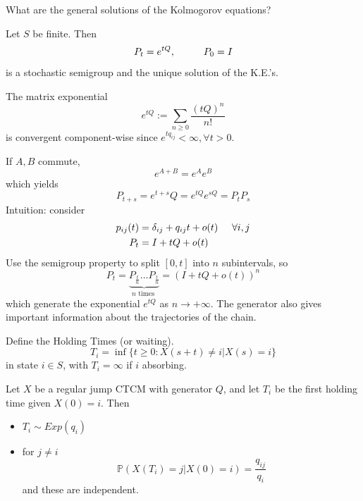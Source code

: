 \documentclass{article}
\begin{document}
What are the general solutions of the Kolmogorov equations?
\begin{theorem}
	Let $S$ be finite. Then
	\begin{equation*}
		P_t = e^{tQ}, \hspace{1 cm} P_0 = I
	\end{equation*}
	is a stochastic semigroup and the unique solution of the K.E.'s. 
\end{theorem}
\begin{remark}
		The matrix exponential
	\begin{equation*}
		e^{tQ}:= \sum_{n \geqslant 0} \frac{(tQ)^n}{n!} 
	\end{equation*}
	is convergent component-wise since $e^{t q_{ij}} < \infty, \forall t > 0$. 
\end{remark}
If $A,B$ commute, 
\begin{equation*}
	e^{A+B} = e^A e ^B
\end{equation*}
which yields
\begin{equation*}
	P_{t+s} = e^{t+s}Q = e^{tQ} e^{sQ} = P_t P_s
\end{equation*}
Intuition: consider 
\begin{equation*}
	\begin{split}
		p_{ij}(t)&= \delta_{ij}+q_{ij}t+ o(t) \hspace{0.5cm}\forall i,j\\
		P_t&=I+tQ+ o(t)
	\end{split}
\end{equation*}
Use the semigroup property to split $[0,t]$ into $n$ subintervals, so 
\begin{equation*}
	P_t= \underbrace{P_{\frac{t}{n}} \dots P_{\frac{t}{n}}}_{n \text{ times }} = (I+tQ+ o(t))^n
\end{equation*}
which generate the exponential $e^{tQ}$ as $n \rightarrow + \infty$. The generator also gives important information about the trajectories of the chain. \\
\begin{definition}
		Define the Holding Times (or waiting).
	\begin{equation*}
		T_i = \inf\{t \geqslant 0: X(s+t)\neq i | X(s)=i\}
	\end{equation*}
	in state $i\in S$, with $T_i=\infty$ if $i$ absorbing.
\end{definition}
\begin{proposition}
		Let $X$ be a regular jump CTCM with generator $Q$, and let $T_i$ be the first holding time given $X(0)=i$. Then\begin{itemize}
		\item $T_i \sim Exp(q_i)$
		\item for $j \neq i$
		\begin{equation*}
			\mathbb{P}(X(T_i)=j|X(0)=i) = \frac{q_{ij}}{q_i}
		\end{equation*}
		and these are independent. 
	\end{itemize}
\end{proposition}
\end{document}
